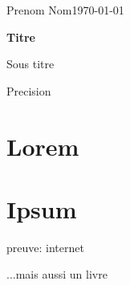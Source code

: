 \documentclass[12pt]{article}
\newcommand{\nomEntier}{Prenom Nom} %
\newcommand{\dateRendu}{\today} %
\newcommand{\titreDoc}{Titre} %
\newcommand{\sousTitreDoc}{Sous titre} %
\newcommand{\sousSousTitreDoc}{Precision} %
\begin{document}
\begin{titlepage}
    \nomEntier \hfill \dateRendu
    \begin{center}
        \vspace*{7cm}
        
        \Huge
        \textbf{\titreDoc}
 
        \vspace{0.5cm}
        \LARGE
        \sousTitreDoc

        \vspace{0.5cm}
        \large
        \sousSousTitreDoc
    \end{center}
 \end{titlepage}
 \thispagestyle{fancy}
\newpage

\tableofcontents
\newpage

\section{Lorem}
\lipsum
\section{Ipsum}
\lipsum

\cite{WEBSITE:1}{preuve: internet}


\cite{BOOK:1}{...mais aussi un livre}

\printbibliography
\end{document}
